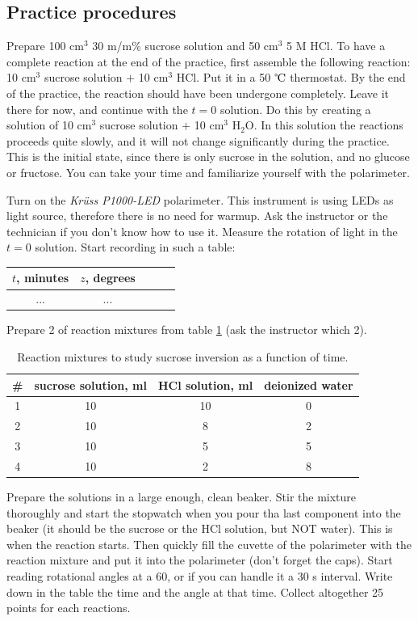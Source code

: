 \subsection{Practice procedures}
Prepare 100 cm$^3$ 30 m/m\% sucrose solution and 50 cm$^3$ 5 M HCl. To have a complete reaction at the end of the practice, first assemble the following reaction: 10 cm$^3$ sucrose solution $+$ 10 cm$^3$ HCl. Put it in a 50 $\celsius$ thermostat. By the end of the practice, the reaction should have been undergone completely. Leave it there for now, and continue with the $t = 0$ solution. Do this by creating a solution of 10 cm$^3$ sucrose solution $+$ 10 cm$^3$ H$_2$O. In this solution the reactions proceeds quite slowly, and it will not change significantly during the practice. This is the initial state, since there is only sucrose in the solution, and no glucose or fructose. You can take your time and familiarize yourself with the polarimeter.

Turn on the \emph{Krüss P1000-LED} polarimeter. This instrument is using LEDs as light source, therefore there is no need for warmup. Ask the instructor or the technician if you don't know how to use it. Measure the rotation of light in the $t = 0$ solution. Start recording in such a table:

\begin{center}
\begin{tabular}{|c|c|c|c|c|}
\hline
$t$, minutes & $z$, degrees \\
\hline
... & ... \\
\end{tabular}
\end{center}
 
Prepare 2 of reaction mixtures from table \ref{table:reactions} (ask the instructor which 2).

\begin{table}
\caption{Reaction mixtures to study sucrose inversion as a function of time.}
\centering
\begin{tabular}{cccc}
\# & sucrose solution, ml & HCl solution, ml & deionized water \\
\hline
1 & 10 & 10 & 0 \\
2 & 10 & 8 & 2 \\
3 & 10 & 5 & 5 \\
4 & 10 & 2 & 8 \\
\end{tabular}
\label{table:reactions}
\end{table}

Prepare the solutions in a large enough, clean beaker. Stir the mixture thoroughly and start the stopwatch when you pour tha last component into the beaker (it should be the sucrose or the HCl solution, but NOT water). This is when the reaction starts. Then quickly fill the cuvette of the polarimeter with the reaction mixture and put it into the polarimeter (don't forget the caps). Start reading rotational angles at a 60, or if you can handle it a 30 s interval. Write down in the table the time and the angle at that time. Collect altogether 25 points for each reactions.

